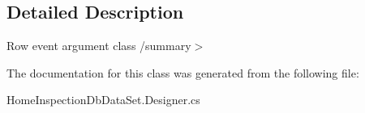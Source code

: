 \subsection{Detailed Description}
Row event argument class /summary$>$ 

The documentation for this class was generated from the following file\+:\begin{DoxyCompactItemize}
\item 
Home\+Inspection\+Db\+Data\+Set.\+Designer.\+cs\end{DoxyCompactItemize}
